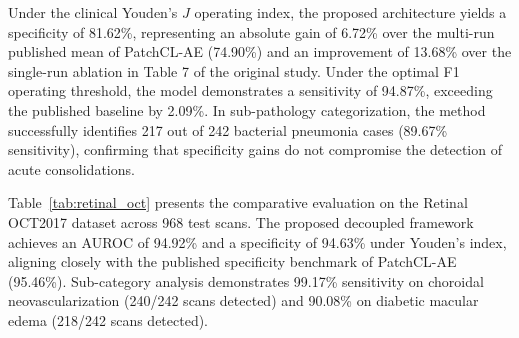 \documentclass[journal]{IEEEtran}
\begin{document}
Under the clinical Youden's $J$ operating index, the proposed architecture yields a specificity of 81.62\%, representing an absolute gain of 6.72\% over the multi-run published mean of PatchCL-AE (74.90\%) and an improvement of 13.68\% over the single-run ablation in Table 7 of the original study. Under the optimal F1 operating threshold, the model demonstrates a sensitivity of 94.87\%, exceeding the published baseline by 2.09\%. In sub-pathology categorization, the method successfully identifies 217 out of 242 bacterial pneumonia cases (89.67\% sensitivity), confirming that specificity gains do not compromise the detection of acute consolidations.

Table~\ref{tab:retinal_oct} presents the comparative evaluation on the Retinal OCT2017 dataset across 968 test scans. The proposed decoupled framework achieves an AUROC of 94.92\% and a specificity of 94.63\% under Youden's index, aligning closely with the published specificity benchmark of PatchCL-AE (95.46\%). Sub-category analysis demonstrates 99.17\% sensitivity on choroidal neovascularization (240/242 scans detected) and 90.08\% on diabetic macular edema (218/242 scans detected).
\end{document}
